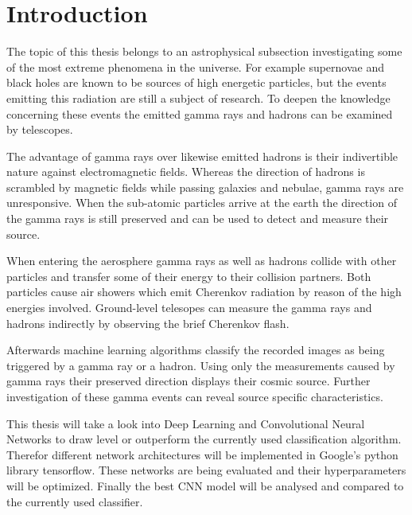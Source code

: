 \chapter{Introduction}
The topic of this thesis belongs to an astrophysical subsection investigating some of the most extreme phenomena in the universe.
For example supernovae and black holes are known to be sources of high energetic particles,
but the events emitting this radiation are still a subject of research.
To deepen the knowledge concerning these events the emitted gamma rays and hadrons can be examined by telescopes.

The advantage of gamma rays over likewise emitted hadrons is their indivertible nature against electromagnetic fields.
Whereas the direction of hadrons is scrambled by magnetic fields while passing galaxies and nebulae, gamma rays are unresponsive.
When the sub-atomic particles arrive at the earth the direction of the gamma rays is still preserved
and can be used to detect and measure their source.

When entering the aerosphere gamma rays as well as hadrons collide with other particles
and transfer some of their energy to their collision partners.
Both particles cause air showers which emit Cherenkov radiation by reason of the high energies involved.
Ground-level telesopes can measure the gamma rays and hadrons indirectly by observing the brief Cherenkov flash.

Afterwards machine learning algorithms classify the recorded images as being triggered by a gamma ray or a hadron.
Using only the measurements caused by gamma rays their preserved direction displays their cosmic source.
Further investigation of these gamma events can reveal source specific characteristics.

This thesis will take a look into Deep Learning and Convolutional Neural Networks
to draw level or outperform the currently used classification algorithm.
Therefor different network architectures will be implemented in Google's python library tensorflow.
These networks are being evaluated and their hyperparameters will be optimized.
Finally the best CNN model will be analysed and compared to the currently used classifier.
